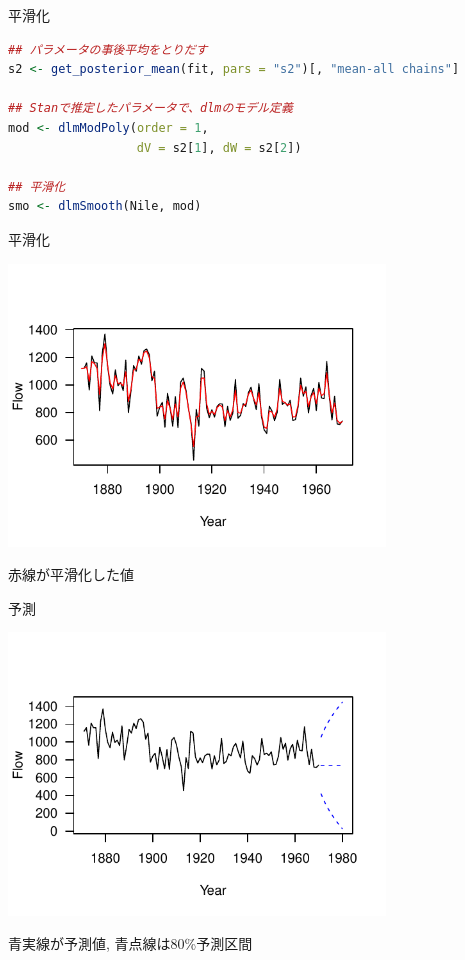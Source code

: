 \documentclass[dvipdfmx,12pt]{beamer}
\begin{document}
\begin{frame}[fragile]{平滑化}
  \begin{lstlisting}[language=R]
## パラメータの事後平均をとりだす
s2 <- get_posterior_mean(fit, pars = "s2")[, "mean-all chains"]

## Stanで推定したパラメータで、dlmのモデル定義
mod <- dlmModPoly(order = 1,
                  dV = s2[1], dW = s2[2])

## 平滑化
smo <- dlmSmooth(Nile, mod)
  \end{lstlisting}
\end{frame}

\begin{frame}{平滑化}
  \begin{center}
    \includegraphics[width=10cm]{dlm1_smooth}
  \end{center}

  赤線が平滑化した値
\end{frame}

\begin{frame}{予測}
  \begin{center}
    \includegraphics[width=10cm]{dlm1_predict}
  \end{center}

  青実線が予測値, 青点線は80\%予測区間
\end{frame}
\end{document}
